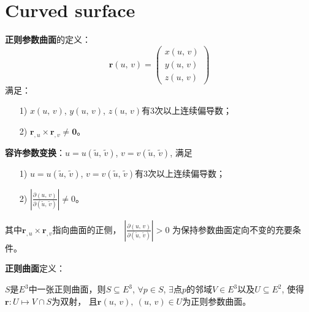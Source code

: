 \section{Curved surface}

\textbf{正则参数曲面}的定义：
\begin{equation}
    \mathbf{r}\left(u,\, v\right) = \left( \begin{array}{c}
        x(u,\,v) \\ y(u,\,v) \\ z(u,\,v)
    \end{array} \right)
\end{equation}
满足：
\begin{enumerate}
    \item[1)] $x(u,\,v)$, $y(u,\,v)$, $z(u,\,v)$有3次以上连续偏导数；
    \item[2)] $\mathbf{r}_{,u}\times\mathbf{r}_{,v}\neq\mathbf{0}$。
\end{enumerate}

\textbf{容许参数变换}：$u=u(\tilde{u},\, \tilde{v})$, $v=v(\tilde{u},\, \tilde{v})$, 满足
\begin{enumerate}
    \item[1)] $u=u(\tilde{u},\, \tilde{v})$, $v=v(\tilde{u},\, \tilde{v})$有3次以上连续偏导数；
    \item[2)] $\left| \frac{\partial\left(u,\, v\right)}{\partial\left(\tilde{u},\, \tilde{v}\right)} \right|\neq 0$。
\end{enumerate}

其中$\mathbf{r}_{,u}\times\mathbf{r}_{,v}$指向曲面的正侧，
$\left| \frac{\partial\left(u,\, v\right)}{\partial\left(\tilde{u},\, \tilde{v}\right)} \right|>0$
为保持参数曲面定向不变的充要条件。

\textbf{正则曲面}定义：
\begin{definition}
    $S$是$E^{3}$中一张正则曲面，则$S \subseteq E^{3}$, $\forall p\in S$, 
    $\exists$点$p$的邻域$V\in E^{3}$以及$U\subseteq E^{2}$, 使得$\mathbf{r}:U\mapsto V\cap S$为双射，
    且$\mathbf{r}\left(u,\,v\right),\ (u,\,v)\in U$为正则参数曲面。
\end{definition}

